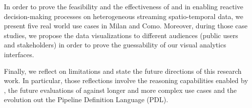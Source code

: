 In order to prove the feasibility and the effectiveness of \frappe{} and \river{} in enabling reactive decision-making processes on heterogeneous streaming spatio-temporal data, we present five real world use cases in Milan and Como.
Moreover, during those case studies, we propose the data visualizations to different audiences (public users and stakeholders) in order to prove the guessability of our visual analytics interfaces.

Finally, we reflect on limitations and state the future directions of this research work.
In particular, those reflections involve the reasoning capabilities enabled by \frappe{}, the future evaluations of \river{} against longer and more complex use cases and the evolution out the Pipeline Definition Language (PDL).




